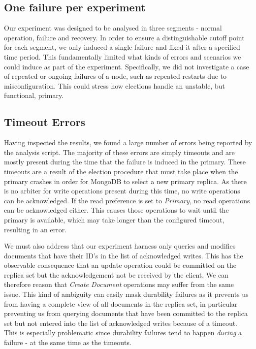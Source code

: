 \subsection{One failure per experiment}
Our experiment was designed to be analysed in three segments - normal operation, failure and recovery. In order to ensure a distinguishable cutoff point for each segment, we only induced a single failure and fixed it after a specified time period. This fundamentally limited what kinds of errors and scenarios we could induce as part of the experiment. Specifically, we did not investigate a case of repeated or ongoing failures of a node, such as repeated restarts due to misconfiguration. This could stress how elections handle an unstable, but functional, primary.

\subsection{Timeout Errors}
Having inspected the results, we found a large number of errors being reported by the analysis script. The majority of these errors are simply timeouts and are mostly present during the time that the failure is induced in the primary. These timeouts are a result of the election procedure that must take place when the primary crashes in order for MongoDB to select a new primary replica. As there is no arbiter for write operations present during this time, no write operations can be acknowledged. If the read preference is set to \textit{Primary}, no read operations can be acknowledged either. This causes those operations to wait until the primary is available, which may take longer than the configured timeout, resulting in an error. 

We must also address that our experiment harness only queries and modifies documents that have their ID's in the list of acknowledged writes. This has the observable consequence that an update operation could be committed on the replica set but the acknowledgement not be received by the client. We can therefore reason that \textit{Create Document} operations may suffer from the same issue. This kind of ambiguity can easily mask durability failures as it prevents us from having a complete view of all documents in the replica set, in particular preventing us from querying documents that have been committed to the replica set but not entered into the list of acknowledged writes because of a timeout. This is especially problematic since durability failures tend to happen \textit{during} a failure - at the same time as the timeouts.

